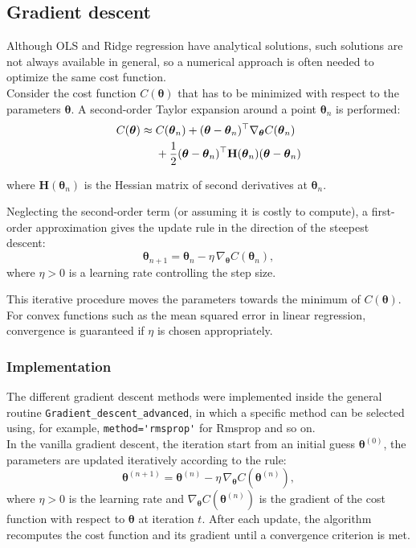 \documentclass[
 reprint,            %
 amsmath,amssymb,
 aps,
]{revtex4-2}
\begin{document}
\subsection{Gradient descent}

Although OLS and Ridge regression have analytical solutions, such solutions are not always available in general, so a numerical approach is often needed to optimize the same cost function.\\

Consider the cost function $C(\boldsymbol{\theta})$ that has to be minimized with respect to the parameters $\boldsymbol{\theta}$\cite{hjorthjensen_week36}.  
A second-order Taylor expansion around a point $\boldsymbol{\theta}_n$ is performed:
\begin{align}
C(\boldsymbol{\theta}) \approx{} & C(\boldsymbol{\theta}_n) 
+ (\boldsymbol{\theta}-\boldsymbol{\theta}_n)^\top \nabla_{\boldsymbol{\theta}} C(\boldsymbol{\theta}_n) \notag\\
& + \frac{1}{2} (\boldsymbol{\theta}-\boldsymbol{\theta}_n)^\top 
\mathbf{H}(\boldsymbol{\theta}_n) (\boldsymbol{\theta}-\boldsymbol{\theta}_n)
\end{align}

where $\mathbf{H}(\boldsymbol{\theta}_n)$ is the Hessian matrix of second derivatives at $\boldsymbol{\theta}_n$.

Neglecting the second-order term (or assuming it is costly to compute), a first-order approximation gives the update rule in the direction of the steepest descent:
\[
\boldsymbol{\theta}_{n+1} = \boldsymbol{\theta}_n - \eta \, \nabla_{\boldsymbol{\theta}} C(\boldsymbol{\theta}_n),
\]
where $\eta > 0$ is a learning rate controlling the step size.  

This iterative procedure moves the parameters towards the minimum of $C(\boldsymbol{\theta})$. For convex functions such as the mean squared error in linear regression, convergence is guaranteed if $\eta$ is chosen appropriately.

\subsubsection{Implementation}
The different gradient descent methods were implemented inside the general routine \verb|Gradient_descent_advanced|, in which a specific method can be selected using, for example, \verb|method='rmsprop'| for Rmsprop and so on. \\
In the vanilla gradient descent, the iteration start from an initial guess $\boldsymbol{\theta}^{(0)}$, the parameters are updated iteratively according to the rule:
\[
\boldsymbol{\theta}^{(n+1)} = \boldsymbol{\theta}^{(n)} - \eta \, \nabla_{\boldsymbol{\theta}} C(\boldsymbol{\theta}^{(n)}),
\]
where $\eta > 0$ is the learning rate and $\nabla_{\boldsymbol{\theta}} C(\boldsymbol{\theta}^{(n)})$ is the gradient of the cost function with respect to $\boldsymbol{\theta}$ at iteration $t$.
After each update, the algorithm recomputes the cost function and its gradient until a convergence criterion is met.\\
\end{document}
